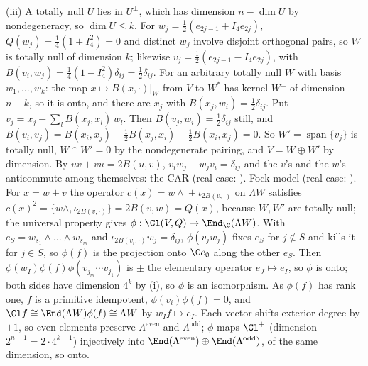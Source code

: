 (iii) A totally null $U$ lies in $U^{\perp}$, which has dimension $n - \dim U$ by nondegeneracy, so $\dim U \le k$. For $w_j = \tfrac12(e_{2j-1} + I_4 e_{2j})$, $Q(w_j) = \tfrac14(1 + I_4^{2}) = 0$ and distinct $w_j$ involve disjoint orthogonal pairs, so $W$ is totally null of dimension $k$; likewise $v_j = \tfrac12(e_{2j-1} - I_4 e_{2j})$, with $B(v_i, w_j) = \tfrac14(1 - I_4^{2})\delta_{ij} = \tfrac12\delta_{ij}$. For an arbitrary totally null $W$ with basis $w_1, \dots, w_k$: the map $x \mapsto B(x, \cdot)|_W$ from $V$ to $W^{*}$ has kernel $W^{\perp}$ of dimension $n - k$, so it is onto, and there are $x_j$ with $B(x_j, w_i) = \tfrac12\delta_{ij}$. Put $v_j = x_j - \sum_l B(x_j, x_l)\, w_l$. Then $B(v_j, w_i) = \tfrac12\delta_{ij}$ still, and $B(v_i, v_j) = B(x_i, x_j) - \tfrac12 B(x_j, x_i) - \tfrac12 B(x_i, x_j) = 0$. So $W' = \operatorname{span}\{v_j\}$ is totally null, $W \cap W' = 0$ by the nondegenerate pairing, and $V = W \oplus W'$ by dimension. By $uv + vu = 2B(u, v)$, $v_i w_j + w_j v_i = \delta_{ij}$ and the $v$'s and the $w$'s anticommute among themselves: the CAR (real case: ).
Fock model (real case: ). For $x = w + v$ the operator $c(x) = w \wedge{} + \iota_{2B(v, \cdot)}$ on $\Lambda W$ satisfies $c(x)^{2} = \{w \wedge, \iota_{2B(v, \cdot)}\} = 2B(v, w) = Q(x)$, because $W, W'$ are totally null; the universal property gives $\phi : \Cl(V, Q) \to \End_\C(\Lambda W)$. With $e_S = w_{s_1} \wedge \dots \wedge w_{s_m}$ and $\iota_{2B(v_i, \cdot)} w_j = \delta_{ij}$, $\phi(v_j w_j)$ fixes $e_S$ for $j \notin S$ and kills it for $j \in S$, so $\phi(f)$ is the projection onto $\C e_\emptyset$ along the other $e_S$. Then $\phi(w_I)\phi(f)\phi(v_{j_m} \cdots v_{j_1})$ is $\pm$ the elementary operator $e_J \mapsto e_I$, so $\phi$ is onto; both sides have dimension $4^{k}$ by (i), so $\phi$ is an isomorphism. As $\phi(f)$ has rank one, $f$ is a primitive idempotent, $\phi(v_i)\phi(f) = 0$, and $\Cl f \cong \End(\Lambda W)\phi(f) \cong \Lambda W$ by $w_I f \mapsto e_I$. Each vector shifts exterior degree by $\pm 1$, so even elements preserve $\Lambda^{\mathrm{even}}$ and $\Lambda^{\mathrm{odd}}$; $\phi$ maps $\Cl^{+}$ (dimension $2^{n-1} = 2 \cdot 4^{k-1}$) injectively into $\End(\Lambda^{\mathrm{even}}) \oplus \End(\Lambda^{\mathrm{odd}})$, of the same dimension, so onto.

